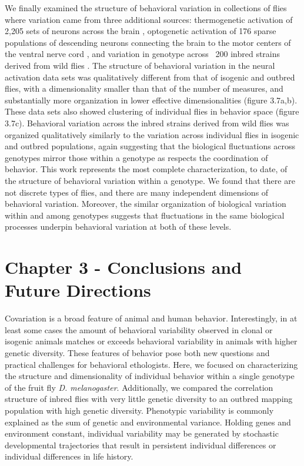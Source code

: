 \documentclass[12pt,letterpaper]{article}
\begin{document}
We finally examined the structure of behavioral variation in collections of flies where variation came from three additional sources: thermogenetic activation of 2,205 sets of neurons across the brain \cite{Robie_Mapping_2017}, optogenetic activation of 176 sparse populations of descending neurons connecting the brain to the motor centers of the ventral nerve cord \cite{Cande_Optogenetic_2018}, and variation in genotype across ~200 inbred strains derived from wild flies \cite{Mackay_The_2012}. The structure of behavioral variation in the neural activation data sets was qualitatively different from that of isogenic and outbred flies, with a dimensionality smaller than that of the number of measures, and substantially more organization in lower effective dimensionalities (figure 3.7a,b). These data sets also showed clustering of individual flies in behavior space (figure 3.7c). Behavioral variation across the inbred strains derived from wild flies was organized qualitatively similarly to the variation across individual flies in isogenic and outbred populations, again suggesting that the biological fluctuations across genotypes mirror those within a genotype as respects the coordination of behavior. This work represents the most complete characterization, to date, of the structure of behavioral variation within a genotype. We found that there are not discrete types of flies, and there are many independent dimensions of behavioral variation. Moreover, the similar organization of biological variation within and among genotypes suggests that fluctuations in the same biological processes underpin behavioral variation at both of these levels.


\section{Chapter 3 - Conclusions and Future Directions}

Covariation is a broad feature of animal and human behavior. Interestingly, in at least some cases the amount of behavioral variability observed in clonal or isogenic animals matches or exceeds behavioral variability in animals with higher genetic diversity. These features of behavior pose both new questions and practical challenges for behavioral ethologists. Here, we focused on characterizing the structure and dimensionality of individual behavior within a single genotype of the fruit fly \textit{D. melanogaster}. Additionally, we compared the correlation structure of inbred flies with very little genetic diversity to an outbred mapping population with high genetic diversity. Phenotypic variability is commonly explained as the sum of genetic and environmental variance. Holding genes and environment constant, individual variability may be generated by stochastic developmental trajectories that result in persistent individual differences or individual differences in life history.
\end{document}

